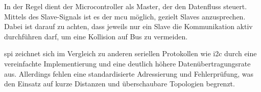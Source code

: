In der Regel dient der Microcontroller als Master, der den Datenfluss steuert.
Mittels des Slave-Signals ist es der \gls{mcu} möglich, gezielt Slaves anzusprechen.
Dabei ist darauf zu achten, dass jeweils nur ein Slave die Kommunikation aktiv durchführen darf, um eine Kollision auf Bus zu vermeiden.

\gls{spi} zeichnet sich im Vergleich zu anderen seriellen Protokollen wie \gls{i2c} durch eine vereinfachte Implementierung und eine deutlich höhere Datenübertragungsrate aus. 
Allerdings fehlen eine standardisierte Adressierung und Fehlerprüfung, was den Einsatz auf kurze Distanzen und überschaubare Topologien begrenzt. 

%

